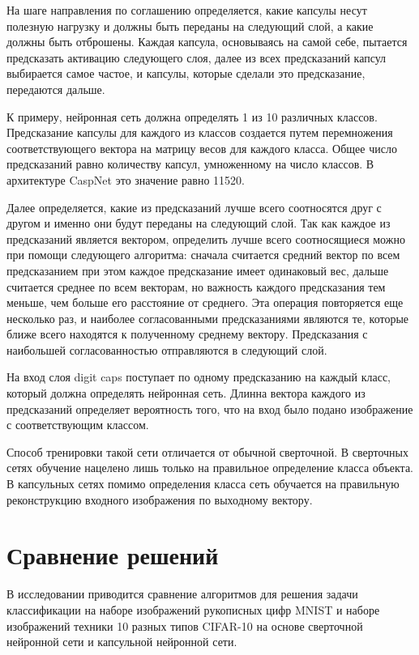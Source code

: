 На шаге направления по соглашению определяется, какие капсулы несут полезную нагрузку и должны быть переданы на следующий слой, а какие должны быть отброшены. Каждая капсула, основываясь на самой себе, пытается предсказать активацию следующего слоя, далее из всех предсказаний капсул выбирается самое частое, и капсулы, которые сделали это предсказание, передаются дальше.

К примеру, нейронная сеть должна определять 1 из 10 различных классов. Предсказание капсулы для каждого из классов создается путем перемножения соответствующего вектора на матрицу весов для каждого класса. Общее число предсказаний равно количеству капсул, умноженному на число классов. В архитектуре CaspNet это значение равно 11520.

Далее определяется, какие из предсказаний лучше всего соотносятся друг с другом и именно они будут переданы на следующий слой. Так как каждое из предсказаний является вектором, определить лучше всего соотносящиеся можно при помощи следующего алгоритма: сначала считается средний вектор по всем предсказанием при этом каждое предсказание имеет одинаковый вес, дальше считается среднее по всем векторам, но важность каждого предсказания тем меньше, чем больше его расстояние от среднего. Эта операция повторяется еще несколько раз, и наиболее согласованными предсказаниями являются те, которые ближе всего находятся к полученному среднему вектору. Предсказания с наибольшей согласованностью отправляются в следующий слой.

На вход слоя digit caps поступает по одному предсказанию на каждый класс, который должна определять нейронная сеть. Длинна вектора каждого из предсказаний определяет вероятность того, что на вход было подано изображение с соответствующим классом.

Способ тренировки такой сети отличается от обычной сверточной. В сверточных сетях обучение нацелено лишь только на правильное определение класса объекта. В капсульных сетях помимо определения класса сеть обучается на правильную реконструкцию входного изображения по выходному вектору.

\section{Сравнение решений}

В исследовании \cite{comparising} приводится сравнение алгоритмов для решения задачи классификации на наборе изображений рукописных цифр MNIST \cite{mnist} и наборе изображений техники 10 разных типов CIFAR-10 \cite{cifar} на основе сверточной нейронной сети и капсульной нейронной сети.

